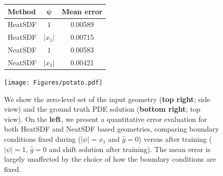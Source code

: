 \documentclass[12pt,openany]{book}
\theoremstyle{plainnormal}
\theoremstyle{remark}
\begin{document}
\begin{figure}[t]
    \centering
    \begin{minipage}[c]{0.45\linewidth}
        \centering
        \begin{tabular}{lcc}
            \toprule
            \textbf{Method} &$\mathbf{\psi}$&\textbf{Mean error} \\
            \midrule
            HeatSDF &$1$     & 0.00589 \\
            HeatSDF & $|x_1|$     &  0.00715 \\
            NeatSDF& $ 1$     & 0.00583   \\
            NeatSDF& $|x_1|$     & 0.00421   \\
            \bottomrule
        \end{tabular}    
        
    \end{minipage}%
    \hspace{0.5em}
    \begin{minipage}[c]{0.4\linewidth}
        \centering
        \texttt{[image: Figures/potato.pdf]}
    \end{minipage}
    \caption{We show the zero-level set of the input geometry (\textbf{top right}; side view) and the ground truth PDE solution (\textbf{bottom right}; top view). On the \textbf{left}, we present a quantitative error evaluation for both HeatSDF and NeatSDF based geometries, comparing boundary conditions fixed during ($|\psi|= x_1$ and $\hat g = 0$) versus after training ($|\psi| = 1$, $\hat g = 0$ and shift solution after training). The mean error is largely unaffected by the choice of how the boundary conditions are fixed.}
    \label{poissonpb}
\end{figure}
\end{document}
